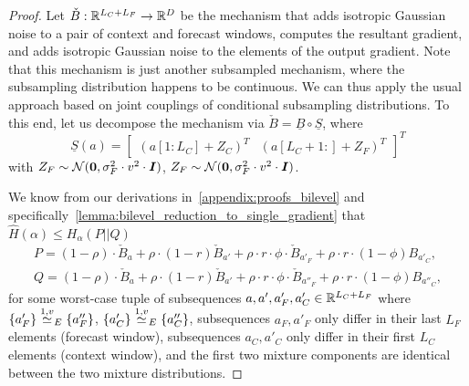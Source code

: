 \begin{proof}
    Let $\check{B} : {\mathbb{R}}^{L_C+L_F} \rightarrow {\mathbb{R}}^D$
    be the mechanism that adds isotropic Gaussian noise  to a pair of context and forecast windows,
    computes the resultant gradient, and adds isotropic Gaussian noise to the elements of the output gradient.
    Note that this mechanism is just another subsampled mechanism, where the subsampling distribution happens to be continuous.
    We can thus apply the usual approach based on joint couplings of conditional subsampling distributions.
    To this end, let us decompose the mechanism via $\check{B} = \underline{B} \circ \underline{S}$,
    where
    \begin{equation*}
        \underline{S}(a) =
        \begin{bmatrix}
            (a[1:L_C] + Z_C)^T &  (a[L_C + 1 : ] + Z_F)^T
        \end{bmatrix}^T
    \end{equation*}
    with $Z_F \sim \mathcal{N}({\bm{0}}, \sigma_F ^2 \cdot v^2 \cdot  {\bm{I}})$, $Z_F \sim \mathcal{N}({\bm{0}}, \sigma_F ^2 \cdot v^2 \cdot  {\bm{I}})$.
    
    We know from our derivations in~\cref{appendix:proofs_bilevel} and specifically~\cref{lemma:bilevel_reduction_to_single_gradient} that
    $\hat{H}(\alpha) \leq H_\alpha(P || Q)$
    \begin{align*}
        P = (1 - \rho) \cdot \check{B}_{a} + \rho \cdot (1-r) \check{B}_{a'} + \rho \cdot r \cdot \phi \cdot   \check{B}_{a'_F} + \rho \cdot r \cdot (1 - \phi) B_{a'_C},
        \\
        Q = (1 - \rho) \cdot \check{B}_{a} + \rho \cdot (1-r) \check{B}_{a'} + \rho \cdot r \cdot \phi \cdot  \check{B}_{a''_F} + \rho \cdot r \cdot (1 - \phi) B_{a''_C},
    \end{align*}
    for some worst-case tuple of subsequences $a, a', a'_F, a'_C \in {\mathbb{R}}^{L_C + L_F}$ where 
    $\{a'_F\} \overset{1,v}{\simeq}_{E} \{a''_F\}$,
    $\{a'_C\} \overset{1,v}{\simeq}_{E} \{a''_C\}$,
    subsequences $a_F, a'_F$ only differ in their last $L_F$ elements (forecast window),
    subsequences $a_C, a'_C$ only differ in their first $L_C$ elements (context window), 
    and the first two mixture components are identical between the two mixture distributions.


\end{proof}
